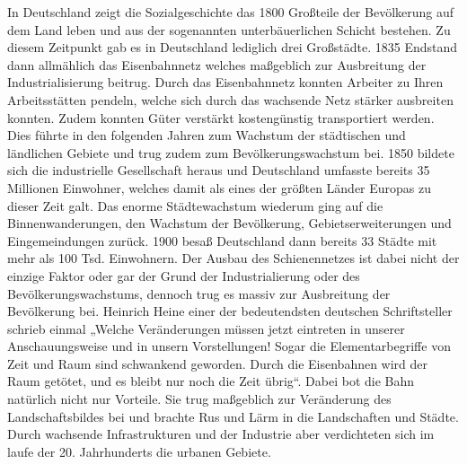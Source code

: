 \documentclass{article}
\begin{document}
In Deutschland zeigt die Sozialgeschichte das 1800 Großteile der Bevölkerung auf dem Land leben und aus der sogenannten unterbäuerlichen Schicht bestehen. Zu diesem Zeitpunkt gab es in Deutschland lediglich drei Großstädte. 1835 Endstand dann allmählich das Eisenbahnnetz welches maßgeblich zur Ausbreitung der Industrialisierung beitrug. Durch das Eisenbahnnetz konnten Arbeiter zu Ihren Arbeitsstätten pendeln, welche sich durch das wachsende Netz stärker ausbreiten konnten. Zudem konnten Güter verstärkt kostengünstig transportiert werden. Dies führte in den folgenden Jahren zum Wachstum der städtischen und ländlichen Gebiete und trug zudem zum Bevölkerungswachstum bei. 1850 bildete sich die industrielle Gesellschaft heraus und Deutschland umfasste bereits 35 Millionen Einwohner, welches damit als eines der größten Länder Europas zu dieser Zeit galt. Das enorme Städtewachstum wiederum ging auf die Binnenwanderungen, den Wachstum der Bevölkerung, Gebietserweiterungen und Eingemeindungen zurück. 1900 besaß Deutschland dann bereits 33 Städte mit mehr als 100 Tsd. Einwohnern. Der Ausbau des Schienennetzes ist dabei nicht der einzige Faktor oder gar der Grund der Industrialierung oder des Bevölkerungswachstums, dennoch trug es massiv zur Ausbreitung der Bevölkerung bei. Heinrich Heine einer der bedeutendsten deutschen Schriftsteller schrieb einmal „Welche Veränderungen müssen jetzt eintreten in unserer Anschauungsweise und in unsern Vorstellungen! Sogar die Elementarbegriffe von Zeit und Raum sind schwankend geworden. Durch die Eisenbahnen wird der Raum getötet, und es bleibt nur noch die Zeit übrig“. Dabei bot die Bahn natürlich nicht nur Vorteile. Sie trug maßgeblich zur Veränderung des Landschaftsbildes bei und brachte Rus und Lärm in die Landschaften und Städte. Durch wachsende Infrastrukturen und der Industrie aber verdichteten sich im laufe der 20. Jahrhunderts die urbanen Gebiete.
\end{document}

